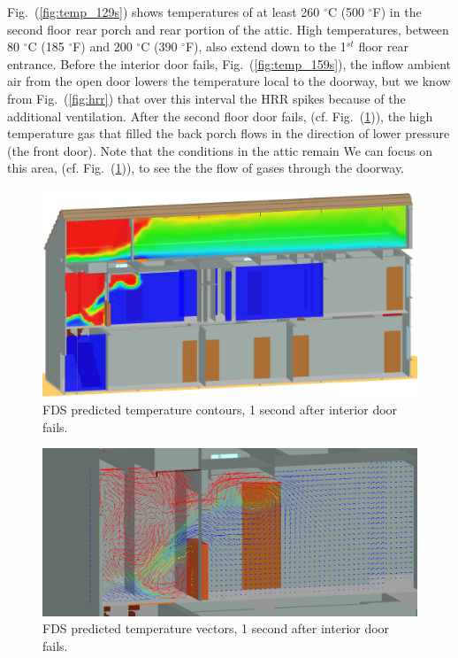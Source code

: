 \documentclass[11pt,oneside]{book}
\begin{document}
Fig.~(\ref{fig:temp_129s}) shows temperatures of at least 260 $^{\circ}$C (500 $^{\circ}$F) in the second floor rear porch and rear portion of the attic. High temperatures, between 80 $^{\circ}$C (185 $^{\circ}$F) and 200 $^{\circ}$C (390 $^{\circ}$F), also extend down to the 1$^{st}$ floor rear entrance. Before the interior door fails, Fig.~(\ref{fig:temp_159s}), the inflow ambient air from the open door lowers the temperature local to the doorway, but we know from Fig.~(\ref{fig:hrr}) that over this interval the HRR spikes because of the additional ventilation. After the second floor door fails, (cf. Fig.~(\ref{fig:temp_161s})), the high temperature gas that filled the back porch flows in the direction of lower pressure (the front door). Note that the conditions in the attic remain  We can focus on this area, (cf. Fig.~(\ref{fig:temp_161s})), to see the the flow of gases through the doorway.  

\begin{figure}[!ht]
\includegraphics[width=.675\textwidth]{../Figures/west_50th_baseline_161}
 

\caption{FDS predicted temperature contours, 1 second after interior door fails.}
\label{fig:temp_161s}
\end{figure}

\begin{figure}[!ht]
\includegraphics[width=.675\textwidth]{../Figures/west_50th_baseline_161v}
 

\caption{FDS predicted temperature vectors, 1 second after interior door fails.}
\label{fig:temp_161v}
\end{figure}
\end{document}
